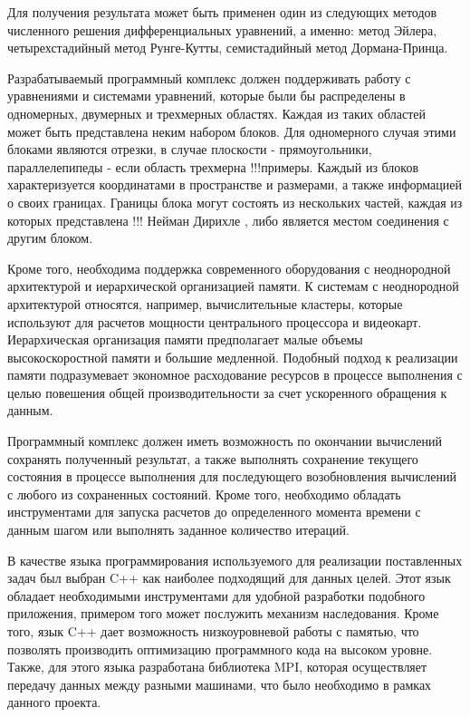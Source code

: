 \documentclass[a4paper, 14pt]{article}
\theoremstyle{definition}
\begin{document}
\par Для получения результата может быть применен один из следующих методов численного решения дифференциальных уравнений, а именно: метод Эйлера, четырехстадийный метод Рунге-Кутты, семистадийный метод Дормана-Принца.

\par Разрабатываемый программный комплекс должен поддерживать работу с уравнениями и системами уравнений, которые были бы распределены в одномерных, двумерных и трехмерных областях. Каждая из таких областей может быть представлена неким набором блоков. Для одномерного случая этими блоками являются отрезки, в случае плоскости - прямоугольники, параллелепипеды - если область трехмерна !!!примеры. Каждый из блоков характеризуется координатами в пространстве и размерами, а также информацией о своих границах. Границы блока могут состоять из нескольких частей, каждая из которых представлена !!! Нейман Дирихле , либо является местом соединения с другим блоком.

\par Кроме того, необходима поддержка современного оборудования с неоднородной архитектурой и иерархической организацией памяти. К системам с неоднородной архитектурой относятся, например, вычислительные кластеры, которые используют для расчетов мощности центрального процессора и видеокарт. Иерархическая организация памяти предполагает малые объемы высокоскоростной памяти и большие медленной. Подобный подход к реализации памяти подразумевает экономное расходование ресурсов в процессе выполнения с целью повешения общей производительности за счет ускоренного обращения к данным.

\par Программный комплекс должен иметь возможность по окончании вычислений сохранять полученный результат, а также выполнять сохранение текущего состояния в процессе выполнения для последующего возобновления вычислений с любого из сохраненных состояний. Кроме того, необходимо обладать инструментами для запуска расчетов до определенного момента времени с данным шагом или выполнять заданное количество итераций.

\par В качестве языка программирования используемого для реализации поставленных задач был выбран C++ как наиболее подходящий для данных целей. Этот язык обладает необходимыми инструментами для удобной разработки подобного приложения, примером того может послужить механизм наследования. Кроме того, язык C++ дает возможность низкоуровневой работы с памятью, что позволять производить оптимизацию программного кода на высоком уровне. Также, для этого языка разработана библиотека MPI, которая осуществляет передачу данных между разными машинами, что было необходимо в рамках данного проекта.
\end{document}
